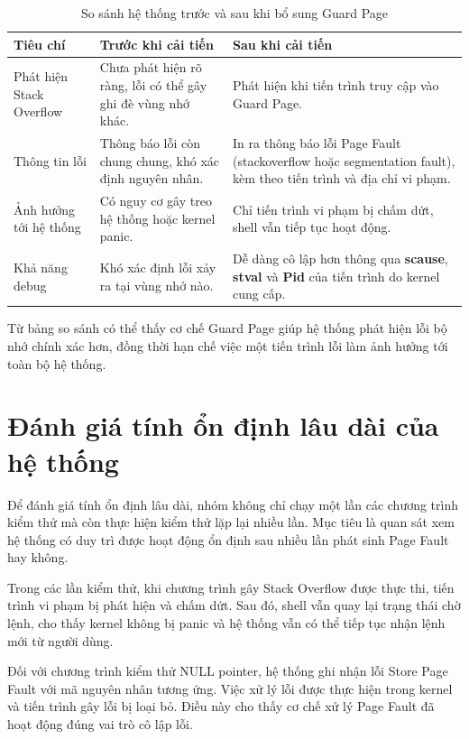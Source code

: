 \begin{table}[h]
\centering
\begin{tabular}{|p{3.5cm}|p{5cm}|p{5cm}|}
\hline
\textbf{Tiêu chí} & \textbf{Trước khi cải tiến} & \textbf{Sau khi cải tiến} \\
\hline
Phát hiện Stack Overflow 
& Chưa phát hiện rõ ràng, lỗi có thể gây ghi đè vùng nhớ khác. 
& Phát hiện khi tiến trình truy cập vào Guard Page. \\
\hline
Thông tin lỗi 
& Thông báo lỗi còn chung chung, khó xác định nguyên nhân. 
& In ra thông báo lỗi Page Fault (stackoverflow hoặc segmentation fault), kèm theo tiến trình và địa chỉ vi phạm. \\
\hline
Ảnh hưởng tới hệ thống 
& Có nguy cơ gây treo hệ thống hoặc kernel panic. 
& Chỉ tiến trình vi phạm bị chấm dứt, shell vẫn tiếp tục hoạt động. \\
\hline
Khả năng debug 
& Khó xác định lỗi xảy ra tại vùng nhớ nào. 
& Dễ dàng cô lập  hơn thông qua \textbf{scause}, \textbf{stval} và \textbf{Pid} của tiến trình do kernel cung cấp. \\
\hline
\end{tabular}
\caption{So sánh hệ thống trước và sau khi bổ sung Guard Page}
\end{table}

Từ bảng so sánh có thể thấy cơ chế Guard Page giúp hệ thống phát hiện lỗi bộ nhớ chính xác hơn, đồng thời hạn chế việc một tiến trình lỗi làm ảnh hưởng tới toàn bộ hệ thống.

\section{Đánh giá tính ổn định lâu dài của hệ thống}

Để đánh giá tính ổn định lâu dài, nhóm không chỉ chạy một lần các chương trình kiểm thử mà còn thực hiện kiểm thử lặp lại nhiều lần. Mục tiêu là quan sát xem hệ thống có duy trì được hoạt động ổn định sau nhiều lần phát sinh Page Fault hay không.

Trong các lần kiểm thử, khi chương trình gây Stack Overflow được thực thi, tiến trình vi phạm bị phát hiện và chấm dứt. Sau đó, shell vẫn quay lại trạng thái chờ lệnh, cho thấy kernel không bị panic và hệ thống vẫn có thể tiếp tục nhận lệnh mới từ người dùng.

Đối với chương trình kiểm thử NULL pointer, hệ thống ghi nhận lỗi Store Page Fault với mã nguyên nhân tương ứng. Việc xử lý lỗi được thực hiện trong kernel và tiến trình gây lỗi bị loại bỏ. Điều này cho thấy cơ chế xử lý Page Fault đã hoạt động đúng vai trò cô lập lỗi.

